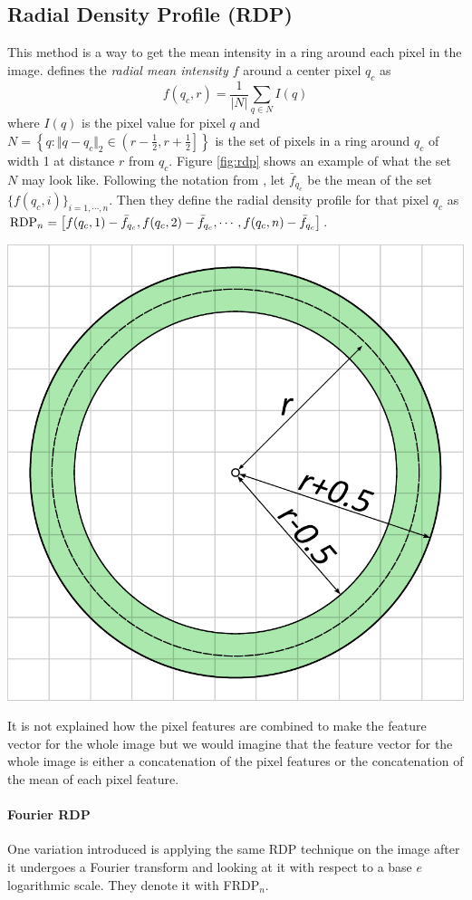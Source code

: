 \begin{multicols}{2}
\subsection{Radial Density Profile (RDP)}
This method is a way to get the mean intensity in a ring around each pixel in the image. \citet{kylberg2011virus} defines the \emph{radial mean intensity $f$} around a center pixel $q_c$ as 
\[ f(q_c, r) = \frac{1}{|N|} \sum\limits_{q\in N} I(q) \]
where $I(q)$ is the pixel value for pixel $q$ and $N = \left\{ q: \Vert q-q_c \Vert_2 \in \left( r-\frac{1}{2}, r+\frac{1}{2} \right] \right\}$ is the set of pixels in a ring around $q_c$ of width 1 at distance $r$ from $q_c$. Figure \ref{fig:rdp} shows an example of what the set $N$ may look like. Following the notation from \citet{kylberg2011virus}, let $\bar{f}_{q_c}$ be the mean of the set $\{ f(q_c,i) \}_{i = 1, \cdots, n}$. Then they define the radial density profile for that pixel $q_c$ as $\textnormal{RDP}_n = \left[ f(q_c,1)-\bar{f}_{q_c}, f(q_c, 2)-\bar{f}_{q_c}, \cdots, f(q_c,n)-\bar{f}_{q_c} \right]$. 
\begin{Figure}
	\centering
	\includegraphics[width=0.5\linewidth]{images/rdp.pdf}
	\label{fig:rdp}
\end{Figure}
\par It is not explained how the pixel features are combined to make the feature vector for the whole image but we would imagine that the feature vector for the whole image is either a concatenation of the pixel features or the concatenation of the mean of each pixel feature. 
\paragraph{Fourier RDP} One variation \citet{kylberg2011virus} introduced is applying the same RDP technique on the image after it undergoes a Fourier transform and looking at it with respect to a base $e$ logarithmic scale. They denote it with FRDP$_n$. 


\end{multicols}
